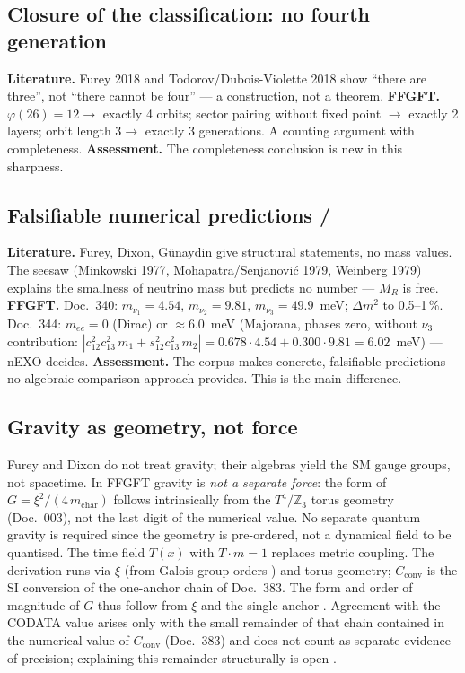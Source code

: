\subsection{Closure of the classification: no fourth generation \BM}
\textbf{Literature.} Furey 2018 and Todorov/Dubois-Violette 2018 show ``there are three'',
not ``there cannot be four'' --- a construction, not a theorem.
\textbf{FFGFT.} $\varphi(26)=12\to$ exactly 4 orbits; sector pairing without fixed point
$\to$ exactly 2 layers; orbit length $3\to$ exactly 3 generations. A counting argument
with completeness.
\textbf{Assessment.} The completeness conclusion is new in this sharpness.

\subsection{Falsifiable numerical predictions \KM/\BM}
\textbf{Literature.} Furey, Dixon, Günaydin give structural statements, no mass values.
The seesaw (Minkowski 1977, Mohapatra/Senjanović 1979, Weinberg 1979) explains the
smallness of neutrino mass but predicts no number --- $M_R$ is free.
\textbf{FFGFT.} Doc.~340: $m_{\nu_1}=4.54$, $m_{\nu_2}=9.81$, $m_{\nu_3}=49.9$~meV;
$\Delta m^2$ to 0.5--1\,\%. Doc.~344: $m_{ee}=0$ (Dirac) or $\approx6.0$~meV (Majorana, phases zero, without
$\nu_3$ contribution: $|c_{12}^2c_{13}^2\,m_1 + s_{12}^2c_{13}^2\,m_2| = 0.678\cdot4.54 + 0.300\cdot9.81 =
6.02$~meV) --- nEXO decides.
\textbf{Assessment.} The corpus makes concrete, falsifiable predictions no algebraic
comparison approach provides. This is the main difference.

\subsection{Gravity as geometry, not force \BM}
Furey and Dixon do not treat gravity;
their algebras yield the SM gauge groups, not spacetime. In FFGFT gravity is
\emph{not a separate force}: the form of $G=\xi^2/(4\,m_\text{char})$ follows intrinsically
from the $T^4/\mathbb{Z}_3$ torus geometry (Doc.~003), not the last digit of the
numerical value. No separate
quantum gravity is required since the geometry is pre-ordered, not a dynamical
field to be quantised. The time field $T(x)$ with $T\cdot m=1$ replaces metric
coupling. The derivation runs via $\xi$ (from Galois group orders \KM) and
torus geometry; $C_\text{conv}$ is the SI conversion of the one-anchor chain of
Doc.~383. The form and order of magnitude of $G$ thus follow from $\xi$ and the
single anchor \KM. Agreement with the CODATA value arises only with the small
remainder of that chain contained in the numerical value of $C_\text{conv}$
(Doc.~383) and does not count as separate evidence of precision; explaining this
remainder structurally is open \SM.


